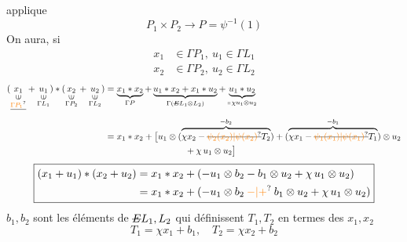 applique
\[
P_1\times P_2\longrightarrow P=\psi^{-1}(1)
\]
On aura, si
\[
\begin{aligned}
x_1&\in\Gamma P_1,\ u_1\in\Gamma L_1\\
x_2&\in\Gamma P_2,\ u_2\in\Gamma L_2
\end{aligned}
\]
\[
\begin{aligned}
(\underset{\substack{\rotatebox{90}{$\in$}\\\deleted{\unsure{\Gamma P_1}}}}{x_1}
+\underset{\substack{\rotatebox{90}{$\in$}\\\Gamma L_1}}{u_1})*
(\underset{\substack{\rotatebox{90}{$\in$}\\\Gamma P_2}}{x_2}
+\underset{\substack{\rotatebox{90}{$\in$}\\\Gamma L_2}}{u_2})
&=\underbrace{x_1*x_2}_{\Gamma P}
+\underbrace{u_1*x_2+x_1*u_2}_{\Gamma(\deleted{E}L_1\otimes L_2)}
+\underbrace{u_1*u_2}_{\shortparallel\,\chi u_1\otimes u_2}\\
&=x_1*x_2+\bigl[u_1\otimes(\overbrace{\chi x_2-\deleted{\unsure{\psi_2(x_2)|\psi(x_2)}}T_2}^{-b_2})
+(\overbrace{\chi x_1-\deleted{\unsure{\psi_1(x_1)|\psi(x_1)}}T_1}^{-b_1})\otimes u_2\\
&\hspace{9em}+\chi\,u_1\otimes u_2\bigr]
\end{aligned}
\]
\[
\boxed{\begin{aligned}
(x_1+u_1)*(x_2+u_2)&=x_1*x_2+(-u_1\otimes b_2-b_1\otimes u_2+\chi\,u_1\otimes u_2)\\
&=x_1*x_2+(-u_1\otimes b_2\mathbin{\unsure{-|+}}b_1\otimes u_2+\chi\,u_1\otimes u_2)
\end{aligned}}
\]
$b_1,b_2$ sont les éléments de $\deleted{E}L_1,L_2$ qui définissent $T_1,T_2$ en termes des $x_1,x_2$
\[
T_1=\chi x_1+b_1,\quad T_2=\chi x_2+b_2
\]
